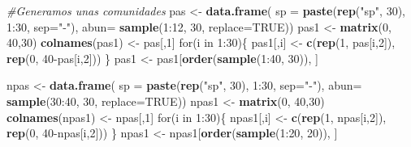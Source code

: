 \documentclass[]{book}
\newenvironment{Shaded}{\begin{snugshade}}{\end{snugshade}}
\newcommand{\KeywordTok}[1]{\textcolor[rgb]{0.13,0.29,0.53}{\textbf{{#1}}}}
\newcommand{\DataTypeTok}[1]{\textcolor[rgb]{0.13,0.29,0.53}{{#1}}}
\newcommand{\DecValTok}[1]{\textcolor[rgb]{0.00,0.00,0.81}{{#1}}}
\newcommand{\StringTok}[1]{\textcolor[rgb]{0.31,0.60,0.02}{{#1}}}
\newcommand{\CommentTok}[1]{\textcolor[rgb]{0.56,0.35,0.01}{\textit{{#1}}}}
\newcommand{\OtherTok}[1]{\textcolor[rgb]{0.56,0.35,0.01}{{#1}}}
\newcommand{\NormalTok}[1]{{#1}}
\begin{document}
\begin{Shaded}
\begin{Highlighting}[]
\CommentTok{#Generamos unas comunidades}
\NormalTok{pas <-}\StringTok{ }\KeywordTok{data.frame}\NormalTok{( }\DataTypeTok{sp =} \KeywordTok{paste}\NormalTok{(}\KeywordTok{rep}\NormalTok{(}\StringTok{"sp"}\NormalTok{, }\DecValTok{30}\NormalTok{), }\DecValTok{1}\NormalTok{:}\DecValTok{30}\NormalTok{, }\DataTypeTok{sep=}\StringTok{"-"}\NormalTok{), }\DataTypeTok{abun=} \KeywordTok{sample}\NormalTok{(}\DecValTok{1}\NormalTok{:}\DecValTok{12}\NormalTok{, }\DecValTok{30}\NormalTok{, }\DataTypeTok{replace=}\OtherTok{TRUE}\NormalTok{))}
\NormalTok{pas1 <-}\StringTok{ }\KeywordTok{matrix}\NormalTok{(}\DecValTok{0}\NormalTok{, }\DecValTok{40}\NormalTok{,}\DecValTok{30}\NormalTok{)}
\KeywordTok{colnames}\NormalTok{(pas1) <-}\StringTok{ }\NormalTok{pas[,}\DecValTok{1}\NormalTok{]}
\NormalTok{for(i in }\DecValTok{1}\NormalTok{:}\DecValTok{30}\NormalTok{)\{}
\NormalTok{pas1[,i] <-}\StringTok{ }\KeywordTok{c}\NormalTok{(}\KeywordTok{rep}\NormalTok{(}\DecValTok{1}\NormalTok{, pas[i,}\DecValTok{2}\NormalTok{]), }\KeywordTok{rep}\NormalTok{(}\DecValTok{0}\NormalTok{, }\DecValTok{40}\NormalTok{-pas[i,}\DecValTok{2}\NormalTok{]))}
\NormalTok{\}}
\NormalTok{pas1 <-}\StringTok{ }\NormalTok{pas1[}\KeywordTok{order}\NormalTok{(}\KeywordTok{sample}\NormalTok{(}\DecValTok{1}\NormalTok{:}\DecValTok{40}\NormalTok{, }\DecValTok{30}\NormalTok{)), ]}

\NormalTok{npas <-}\StringTok{ }\KeywordTok{data.frame}\NormalTok{( }\DataTypeTok{sp =} \KeywordTok{paste}\NormalTok{(}\KeywordTok{rep}\NormalTok{(}\StringTok{"sp"}\NormalTok{, }\DecValTok{30}\NormalTok{), }\DecValTok{1}\NormalTok{:}\DecValTok{30}\NormalTok{, }\DataTypeTok{sep=}\StringTok{"-"}\NormalTok{), }\DataTypeTok{abun=} \KeywordTok{sample}\NormalTok{(}\DecValTok{30}\NormalTok{:}\DecValTok{40}\NormalTok{, }\DecValTok{30}\NormalTok{, }\DataTypeTok{replace=}\OtherTok{TRUE}\NormalTok{))}
\NormalTok{npas1 <-}\StringTok{ }\KeywordTok{matrix}\NormalTok{(}\DecValTok{0}\NormalTok{, }\DecValTok{40}\NormalTok{,}\DecValTok{30}\NormalTok{)}
\KeywordTok{colnames}\NormalTok{(npas1) <-}\StringTok{ }\NormalTok{npas[,}\DecValTok{1}\NormalTok{]}
\NormalTok{for(i in }\DecValTok{1}\NormalTok{:}\DecValTok{30}\NormalTok{)\{}
\NormalTok{npas1[,i] <-}\StringTok{ }\KeywordTok{c}\NormalTok{(}\KeywordTok{rep}\NormalTok{(}\DecValTok{1}\NormalTok{, npas[i,}\DecValTok{2}\NormalTok{]), }\KeywordTok{rep}\NormalTok{(}\DecValTok{0}\NormalTok{, }\DecValTok{40}\NormalTok{-npas[i,}\DecValTok{2}\NormalTok{]))}
\NormalTok{\}}
\NormalTok{npas1 <-}\StringTok{ }\NormalTok{npas1[}\KeywordTok{order}\NormalTok{(}\KeywordTok{sample}\NormalTok{(}\DecValTok{1}\NormalTok{:}\DecValTok{20}\NormalTok{, }\DecValTok{20}\NormalTok{)), ]}


\end{Highlighting}
\end{Shaded}
\end{document}
